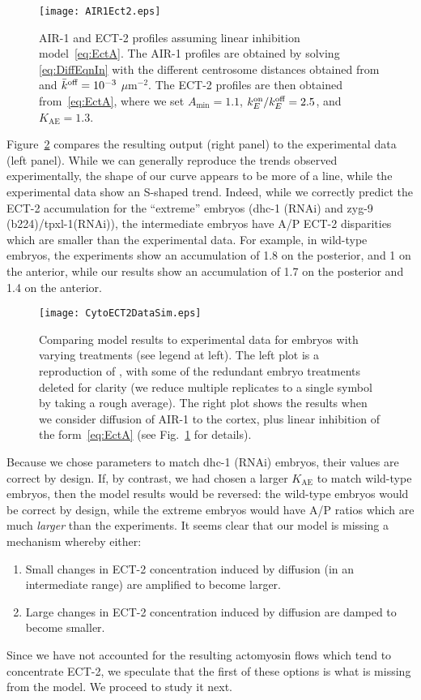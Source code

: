 \documentclass[11pt]{article}
\begin{document}
\begin{figure}
\centering
\texttt{[image: AIR1Ect2.eps]}
\caption{\label{fig:AIRECT}AIR-1 and ECT-2 profiles assuming linear inhibition model\ \eqref{eq:EctA}. The AIR-1 profiles are obtained by solving \eqref{eq:DiffEqnIn} with the different centrosome distances obtained from \cite{longhini2022aurora} and $\bar{k}^\text{off}=10^{-3}$ $\mu$m$^{-2}$. The ECT-2 profiles are then obtained from\ \eqref{eq:EctA}, where we set $A_\text{min}=1.1$, $k^\text{on}_E/k^\text{off}_E=2.5$, and $K_\text{AE}=1.3$. }
\end{figure}

Figure\ \ref{fig:DiffCSep} compares the resulting output (right panel) to the experimental data (left panel). While we can generally reproduce the trends observed experimentally, the shape of our curve appears to be more of a line, while the experimental data show an S-shaped trend. Indeed, while we correctly predict the ECT-2 accumulation for the ``extreme'' embryos (dhc-1 (RNAi) and zyg-9 (b224)/tpxl-1(RNAi)), the intermediate embryos have A/P ECT-2 disparities which are smaller than the experimental data. For example, in wild-type embryos, the experiments show an accumulation of 1.8 on the posterior, and 1 on the anterior, while our results show an accumulation of 1.7 on the posterior and 1.4 on the anterior. 



\begin{figure}
\centering
\texttt{[image: CytoECT2DataSim.eps]}
\caption{\label{fig:DiffCSep} Comparing model results to experimental data for embryos with varying treatments (see legend at left). The left plot is a reproduction of \cite[Fig.~7A]{longhini2022aurora}, with some of the redundant embryo treatments deleted for clarity (we reduce multiple replicates to a single symbol by taking a rough average). The right plot shows the results when we consider diffusion of AIR-1 to the cortex, plus linear inhibition of the form\ \eqref{eq:EctA} (see Fig.\ \ref{fig:AIRECT} for details).}
\end{figure}

Because we chose parameters to match dhc-1 (RNAi) embryos, their values are correct by design. If, by contrast, we had chosen a larger $K_\text{AE}$ to match wild-type embryos, then the model results would be reversed: the wild-type embryos would be correct by design, while the extreme embryos would have A/P ratios which are much \emph{larger} than the experiments. 
It seems clear that our model is missing a mechanism whereby either:
\begin{enumerate}
\item Small changes in ECT-2 concentration induced by diffusion (in an intermediate range) are amplified to become larger.
\item Large changes in ECT-2 concentration induced by diffusion are damped to become smaller.
\end{enumerate}
Since we have not accounted for the resulting actomyosin flows which tend to concentrate ECT-2, we speculate that the first of these options is what is missing from the model. We proceed to study it next.
\end{document}
